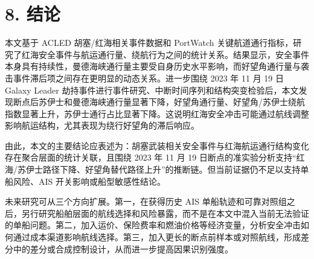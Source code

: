 \documentclass[
]{ctexart}
\begin{document}
\section{8. 结论}\label{ux7ed3ux8bba}

本文基于 ACLED 胡塞/红海相关事件数据和 PortWatch
关键航道通行指标，研究了红海安全事件与航运通行量、绕航行为之间的统计关系。结果显示，安全事件本身具有持续性，曼德海峡通行量主要受自身历史水平影响，而好望角通行量与袭击事件滞后项之间存在更明显的动态关系。进一步围绕
2023 年 11 月 19 日 Galaxy Leader
劫持事件进行事件研究、中断时间序列和结构突变检验后，本文发现断点后苏伊士和曼德海峡通行量显著下降，好望角通行量、好望角/苏伊士绕航指数显著上升，苏伊士通行占比显著下降。这说明红海安全冲击可能通过航线调整影响航运结构，尤其表现为绕行好望角的滞后响应。

由此，本文的主要结论应表述为：胡塞武装相关安全事件与红海航运通行结构变化存在聚合层面的统计关联，且围绕
2023 年 11 月 19
日断点的准实验分析支持``红海/苏伊士路径下降、好望角替代路径上升''的推断链。但当前证据仍不足以支持单船风险、AIS
开关影响或船型敏感性结论。

未来研究可从三个方向扩展。第一，在获得历史 AIS
单船轨迹和可靠对照组之后，另行研究船舶层面的航线选择和风险暴露，而不是在本文中混入当前无法验证的单船问题。第二，加入运价、保险费率和燃油价格等经济变量，分析安全冲击如何通过成本渠道影响航线选择。第三，加入更长的断点前样本或对照航线，形成差分中的差分或合成控制设计，从而进一步提高因果识别强度。



\end{document}

